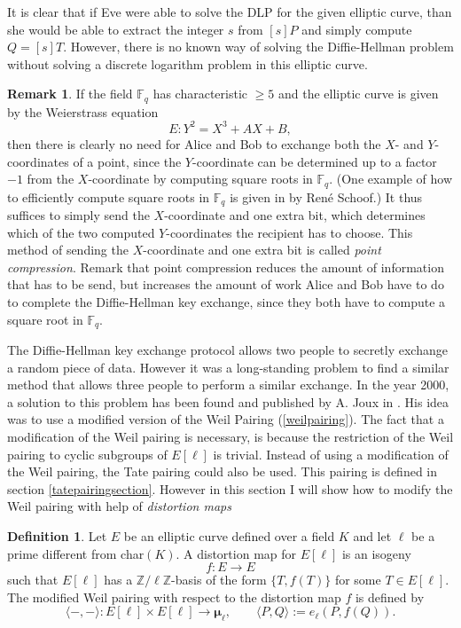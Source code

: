 \documentclass{article}
\numberwithin{equation}{section}
\theoremstyle{definition}
\newtheorem{definition}[theorem]{Definition}
\newtheorem{remark}[theorem]{Remark}
\newcommand{\ZZ}{{\mathbb Z}} %
\newcommand{\Zmod}[1]{\ZZ / #1\ZZ} %
\newcommand{\FF}[1]{{\mathbb F}_{#1}} %
\newcommand{\rou}[1]{\boldsymbol{\mu}_{#1}} %
\begin{document}
It is clear that if Eve were able to solve the DLP for the given elliptic curve, than she would be able to extract the integer $s$ from $[s]P$ and simply compute $Q=[s]T$. However, there is no known way of solving the Diffie-Hellman problem without solving a discrete logarithm problem in this elliptic curve. 

\begin{remark}
If the field $\FF{q}$ has characteristic $\geq 5$ and the elliptic curve is given by the Weierstrass equation $$E:Y^2=X^3+AX+B,$$ then there is clearly no need for Alice and Bob to exchange both the $X$- and $Y$-coordinates of a point, since the $Y$-coordinate can be determined up to a factor $-1$ from the $X$-coordinate by computing square roots in $\FF{q}$. (One example of how to efficiently compute square roots in $\FF{q}$ is given in \cite{Schoof} by Ren\'e Schoof.) It thus suffices to simply send the $X$-coordinate and one extra bit, which determines which of the two computed $Y$-coordinates the recipient has to choose. This method of sending the $X$-coordinate and one extra bit is called \emph{point compression}. Remark that point compression reduces the amount of information that has to be send, but increases the amount of work Alice and Bob have to do to complete the Diffie-Hellman key exchange, since they both have to compute a square root in $\FF{q}$. 
\end{remark}

The Diffie-Hellman key exchange protocol allows two people to secretly exchange a random piece of data. However it was a long-standing problem to find a similar method that allows three people  to perform a similar exchange. In the year 2000, a solution to this problem has been found and published by A. Joux in \cite{Joux}. His idea was to use a modified version of the Weil Pairing (\ref{weilpairing}). The fact that a modification of the Weil pairing is necessary, is because the restriction of the Weil pairing to cyclic subgroups of $E[\ell]$ is trivial. Instead of using a modification of the Weil pairing, the Tate pairing could also be used. This pairing is defined in section \ref{tatepairingsection}. However in this section I will show how to modify the Weil pairing with help of \emph{distortion maps}

\begin{definition}\label{modWP}
Let $E$ be an elliptic curve defined over a field $K$ and let $\ell$ be a prime different from char$(K)$. A distortion map for $E[\ell]$ is an isogeny $$f:E \rightarrow E$$ such that $E[\ell]$ has a $\Zmod{\ell}$-basis of the form $\{T,f(T)\}$ for some $T \in E[\ell]$. The modified Weil pairing with respect to the distortion map $f$ is defined by $$\langle - , - \rangle:E[\ell] \times E[\ell] \rightarrow \rou{\ell}, \qquad \langle P,Q \rangle := e_\ell (P,f(Q)).$$
\end{definition} 
\end{document}
